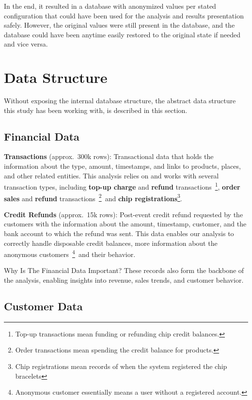 In the end, it resulted in a database with anonymized values per stated configuration that could have been used for the analysis and results presentation safely.
However, the original values were still present in the database, and the database could have been anytime easily restored to the original state if needed and vice versa.


\section{Data Structure}
\label{sec:data-methodology-structure}
Without exposing the internal database structure, the abstract data structure this study has been working with, is described in this section.

\subsection{Financial Data}
\label{subsec:data-methodology-structure-financial}
\textbf{Transactions} (approx.\ 300k rows): Transactional data that holds the information about the type, amount, timestamps, and links to products, places, and other related entities.
This analysis relies on and works with several transaction types, including \textbf{top-up charge} and \textbf{refund} transactions~\footnote{Top-up transactions mean funding or refunding chip credit balances.},
\textbf{order sales} and \textbf{refund} transactions~\footnote{Order transactions mean spending the credit balance for products.}~and
\textbf{chip registrations}\footnote{Chip registrations mean records of when the system registered the chip bracelets}.

\textbf{Credit Refunds} (approx.\ 15k rows): Post-event credit refund requested by the customers with the information about the amount, timestamp, customer, and the bank account to which the refund was sent.
This data enables our analysis to correctly handle disposable credit balances, more information about the anonymous customers~\footnote{Anonymous customer essentially means a user without a registered account.}~and their behavior.

\begin{blue-box}{Why Is The Financial Data Important?}
	These records also form the backbone of the analysis, enabling insights into revenue, sales trends, and customer behavior.
\end{blue-box}

\subsection{Customer Data}
\label{subsec:data-methodology-structure-customer}


